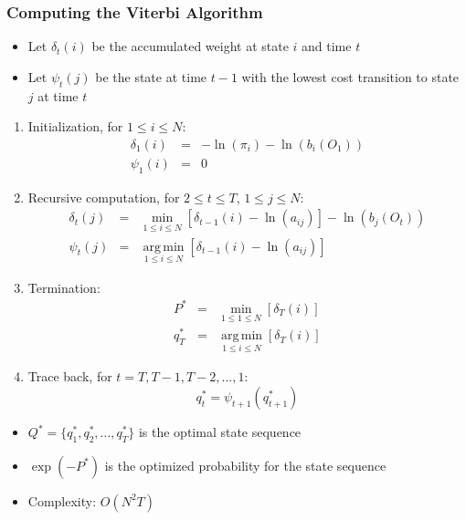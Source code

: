 \documentclass{beamer}
\begin{document}
\begin{frame}[allowframebreaks] \frametitle{Computing the Viterbi Algorithm}

  \begin{itemize}
  \item Let $\delta_t(i)$ be the accumulated weight at state $i$ and time $t$
  \item Let $\psi_t(j)$ be the state at time $t-1$ with the lowest cost
    transition to state $j$ at time $t$
  \end{itemize}

  \begin{enumerate}
  \item Initialization, for $1 \leq i \leq N$:
    \begin{eqnarray*}
      \delta_1(i) & = & -\ln(\pi_i)-\ln(b_i(O_1)) \\
      \psi_1(i) & = & 0
    \end{eqnarray*}
  \item Recursive computation, for $2 \leq t \leq T$, $1 \leq j \leq N$:
    \begin{eqnarray*}
      \delta_t(j) & = & \min_{1\leq i \leq N}[\delta_{t-1}(i)-\ln(a_{ij})]-\ln(b_j(O_t)) \\
      \psi_t(j) & = & \underset{1\leq i \leq N}{\operatorname{arg\,min}}[\delta_{t-1}(i)-\ln(a_{ij})]
    \end{eqnarray*}
  \item Termination:
    \begin{eqnarray*}
      P^* & = & \min_{1 \leq 1 \leq N}[\delta_T(i)]\\
      q_T^* & = & \underset{1\leq i \leq N}{\operatorname{arg\,min}}[\delta_T(i)]
    \end{eqnarray*}
  \item Trace back, for $t = T, T-1, T-2, \dotsc, 1$:
    \begin{displaymath}
      q_t^* = \psi_{t+1}(q_{t+1}^*)
    \end{displaymath}
  \end{enumerate}

  \begin{itemize}
  \item $Q^* = \{q_1^*, q_2^*, \dotsc, q_T^*\}$ is the optimal state sequence
  \item $\exp(-P^*)$ is the optimized probability for the state sequence
  \end{itemize}

  \vspace{2ex}

  \begin{itemize}
  \item Complexity: $O(N^2T)$
  \end{itemize}
  
\end{frame}
\end{document}
